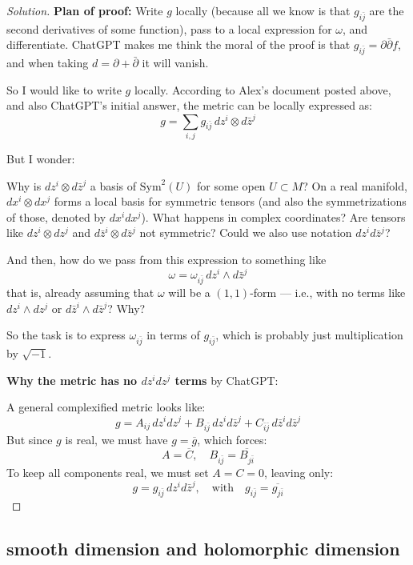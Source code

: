 \begin{proof}[Solution]\leavevmode
\textbf{Plan of proof:} Write \( g \) locally (because all we know is that \( g_{i\bar{j}} \) are the second derivatives of some function), pass to a local expression for \( \omega \), and differentiate. ChatGPT makes me think the moral of the proof is that \( g_{i\bar{j}} = \partial \bar{\partial} f \), and when taking \( d = \partial + \bar{\partial} \) it will vanish.

So I would like to write \( g \) locally. According to Alex’s document posted above, and also ChatGPT’s initial answer, the metric can be locally expressed as:
\[
g = \sum_{i,j} g_{i \bar{j}} \, dz^i \otimes d\bar{z}^j
\]

But I wonder:

Why is \( dz^i \otimes d\bar{z}^j \) a basis of \( \mathrm{Sym}^2(U) \) for some open \( U \subset M \)? On a real manifold, \( dx^i \otimes dx^j \) forms a local basis for symmetric tensors (and also the symmetrizations of those, denoted by \( dx^i dx^j \)). What happens in complex coordinates? Are tensors like \( dz^i \otimes dz^j \) and \( d\bar{z}^i \otimes d\bar{z}^j \) not symmetric? Could we also use notation \( dz^i d\bar{z}^j \)?

And then, how do we pass from this expression to something like
\[
\omega = \omega_{i \bar{j}} \, dz^i \wedge d\bar{z}^j
\]
that is, already assuming that \( \omega \) will be a \((1,1)\)-form — i.e., with no terms like \( dz^i \wedge dz^j \) or \( d\bar{z}^i \wedge d\bar{z}^j \)? Why?

So the task is to express \( \omega_{i \bar{j}} \) in terms of \( g_{i \bar{j}} \), which is probably just multiplication by \( \sqrt{-1} \).

\bigskip

\textbf{Why the metric has no \( dz^i dz^j \) terms} by ChatGPT:

A general complexified metric looks like:
\[
g = A_{ij} \, dz^i dz^j + B_{i\bar{j}} \, dz^i d\bar{z}^j + C_{\bar{i} \bar{j}} \, d\bar{z}^i d\bar{z}^j
\]
But since \( g \) is real, we must have \( g = \overline{g} \), which forces:
\[
A = \overline{C}, \quad B_{i\bar{j}} = \overline{B_{j\bar{i}}}
\]
To keep all components real, we must set \( A = C = 0 \), leaving only:
\[
g = g_{i\bar{j}} \, dz^i d\bar{z}^j, \quad \text{with} \quad g_{i\bar{j}} = \overline{g_{j\bar{i}}}
\]
\end{proof}

\subsection{smooth dimension and holomorphic dimension}

